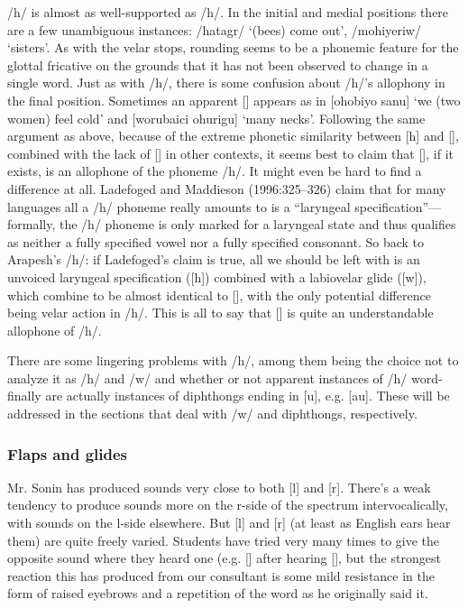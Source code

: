 \documentclass[pdftex,12pt,letterpaper]{article}
\let\ipa\textipa
\def\sw{\ipa{\super w}}
\begin{document}
 /h\sw/ is almost as well-supported as /h/. In the initial and medial positions there are a few unambiguous instances: /h\sw atag\ipa{1}r/ `(bees) come out', /moh\sw iyeriw/ `sisters'. As with the velar stops, rounding seems to be a phonemic feature for the glottal fricative on the grounds that it has not been observed to change in a single word. Just as with /h/, there is some confusion about /h\sw/'s allophony in the final position. Sometimes an apparent [\ipa{F}] appears as in [ohobiyo\ipa{F} \ipa{\textltailn uman@g@s} sanu\ipa{F}] `we (two women) feel cold' and [worubaici ohurigu\ipa{F}] `many necks'. Following the same argument as above, because of the extreme phonetic similarity between [h\sw] and [\ipa{F}], combined with the lack of [\ipa{F}] in other contexts, it seems best to claim that [\ipa{F}], if it exists, is an allophone of the phoneme /h\sw/. It might even be hard to find a difference at all. Ladefoged and Maddieson (1996:325--326) claim that for many languages all a /h/ phoneme really amounts to is a ``laryngeal specification''---formally, the /h/ phoneme is only marked for a laryngeal state and thus qualifies as neither a fully specified vowel nor a fully specified consonant. So back to Arapesh's /h\sw/: if Ladefoged's claim is true, all we should be left with is an unvoiced laryngeal specification ([h]) combined with a labiovelar glide ([w]), which combine to be almost identical to [\ipa{F}], with the only potential difference being velar action in /h\sw/. This is all to say that [\ipa{F}] is quite an understandable allophone of /h\sw/.  %
 
 There are some lingering problems with /h\sw/, among them being the choice not to analyze it as /h/ and /w/ and whether or not apparent instances of /h\sw/ word-finally are actually instances of diphthongs ending in [u], e.g. [au]. These will be addressed in the sections that deal with /w/ and diphthongs, respectively. 

 \subsubsection{Flaps and glides}

 Mr. Sonin has produced sounds very close to both {[l]} and {[r]}. There's a weak tendency to produce sounds more on the r-side of the spectrum intervocalically, with sounds on the l-side elsewhere. But {[l]} and {[r]} (at least as English ears hear them) are quite freely varied. Students have tried very many times to give the opposite sound where they heard one (e.g. {[\ipa{@lmatok\sw}]} after hearing {[\ipa{@rmatok\sw}]}, but the strongest reaction this has produced from our consultant is some mild resistance in the form of raised eyebrows and a repetition of the word as he originally said it.
\end{document}
